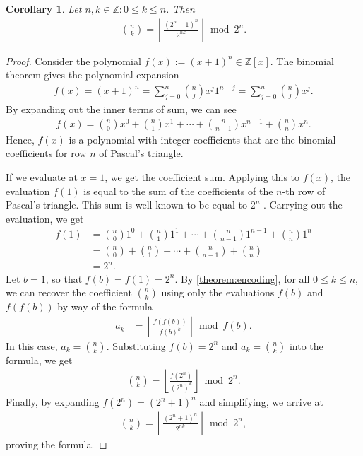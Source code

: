 \documentclass[10pt,a4paper]{article}
\theoremstyle{plain}
\newtheorem{corollary}{Corollary}[section]
\newcommand{\floor}[1]{\left\lfloor #1 \right\rfloor}
\begin{document}
\begin{corollary} \label{corollary:binomialcoefficients}
Let $n,k \in \mathbb{Z} : 0 \leq k \leq n$. Then
\begin{align*}
\binom{n}{k} = \floor{\frac{(2^n+1)^n}{2^{n k}}} \bmod{2^n} .
\end{align*}
\end{corollary}
\begin{proof}
Consider the polynomial $f(x) := (x+1)^n \in \mathbb{Z}[x]$. The binomial theorem gives the polynomial expansion
\begin{align*}
f(x) = (x+1)^n = \sum_{j=0}^n \binom{n}{j} x^j 1^{n-j} = \sum_{j=0}^n \binom{n}{j} x^j .
\end{align*}
By expanding out the inner terms of sum, we can see
\begin{align*}
f(x) = \binom{n}{0} x^0 + \binom{n}{1} x^1 + \cdots + \binom{n}{n-1} x^{n-1} + \binom{n}{n} x^{n} .
\end{align*}
Hence, $f(x)$ is a polynomial with integer coefficients that are the binomial coefficients for row $n$ of Pascal's triangle. 

If we evaluate at $x=1$, we get the coefficient sum. Applying this to $f(x)$, the evaluation $f(1)$ is equal to the sum of the coefficients of the $n$-th row of Pascal's triangle. This sum is well-known to be equal to $2^n$ \cite{A000079}. Carrying out the evaluation, we get
\begin{align*}
f(1) &= \binom{n}{0} 1^0 + \binom{n}{1} 1^1 + \cdots + \binom{n}{n-1} 1^{n-1} + \binom{n}{n} 1^n \\
&= \binom{n}{0} + \binom{n}{1} + \cdots + \binom{n}{n-1} + \binom{n}{n} \\
&= 2^n .
\end{align*}
Let $b = 1$, so that $f(b) = f(1) = 2^n$. By \cref{theorem:encoding}, for all $0 \leq k \leq n$, we can recover the coefficient $\binom{n}{k}$ using only the evaluations $f(b)$ and $f(f(b))$ by way of the formula
\begin{align*}
    a_k &= \floor{\frac{f(f(b))}{f(b)^k}} \bmod{f(b)} .
\end{align*}
In this case, $a_k = \binom{n}{k}$. Substituting $f(b) = 2^n$ and $a_k = \binom{n}{k}$ into the formula, we get
\begin{align*}
    \binom{n}{k} = \floor{\frac{f(2^n)}{(2^n)^k}} \bmod{2^n} .
\end{align*}
Finally, by expanding $f(2^n) = (2^n+1)^n$ and simplifying, we arrive at
\begin{align*}
    \binom{n}{k} = \floor{\frac{(2^n+1)^n}{2^{nk}}} \bmod{2^n} ,
\end{align*}
proving the formula.
\end{proof}
\end{document}
